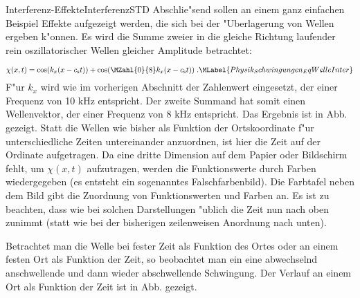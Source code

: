 \begin{MXContent}{Interferenz-Effekte}{Interferenz}{STD}%
Abschlie"send sollen an einem ganz einfachen Beispiel Effekte aufgezeigt werden, die sich bei der "Uberlagerung von Wellen ergeben k"onnen. Es wird die Summe zweier in die gleiche Richtung laufender rein oszillatorischer Wellen gleicher Amplitude betrachtet:

\begin{equation}
  \chi(x,t)=\cos(k_x(x-c_\mathrm{s}t))+\cos(\MZahl{0}{8}k_x(x-c_\mathrm{s}t))\;.\MLabel{Physik_Schwingungen_EqWelleInter}
\end{equation}
F"ur $k_x$ wird wie im vorherigen Abschnitt der Zahlenwert eingesetzt, der einer Frequenz von 10 kHz entspricht. Der zweite Summand hat somit einen Wellenvektor, der einer Frequenz von 8 kHz entspricht. Das Ergebnis ist in Abb.  gezeigt. Statt die Wellen wie bisher als Funktion der Ortskoordinate f"ur unterschiedliche Zeiten untereinander anzuordnen, ist hier die Zeit auf der Ordinate aufgetragen. Da eine dritte Dimension auf dem Papier oder Bildschirm fehlt, um $\chi(x,t)$ aufzutragen, werden die Funktionswerte durch Farben wiedergegeben (es entsteht ein sogenanntes Falschfarbenbild). Die Farbtafel neben dem Bild gibt die Zuordnung von Funktionswerten und Farben an. Es ist zu beachten, dass wie bei solchen Darstellungen "ublich die Zeit nun nach oben zunimmt (statt wie bei der bisherigen zeilenweisen Anordnung nach unten).

\begin{center}
  \end{center}

Betrachtet man die Welle bei fester Zeit als Funktion des Ortes oder an einem festen Ort als Funktion der Zeit, so beobachtet man ein eine abwechselnd anschwellende und dann wieder abschwellende Schwingung. Der Verlauf an einem Ort als Funktion der Zeit ist in Abb.  gezeigt.

\begin{center}
  \end{center}


\end{MXContent}
